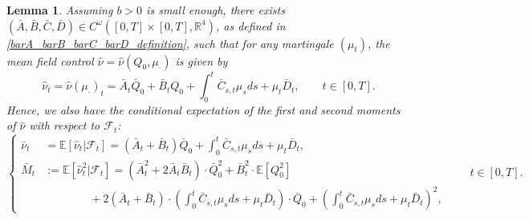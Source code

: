 \documentclass[10pt]{article}
\newtheorem{lemma}[theorem]{Lemma}
\begin{document}
\begin{lemma}\label{lem.hatnu}
Assuming $b > 0$ is small enough, there exists $(\bar{A}, \bar{B}, \bar{C}, \bar{D}) \in C^{\omega}([0,T] \times [0,T], \mathbb{R}^4)$, as defined in \eqref{barA_barB_barC_barD_definition}, such that for any martingale $(\mu_t)$, the mean field control $\hat{\nu} = \hat{\nu}(Q_0,\mu_\cdot)$ is given by
\begin{equation}\label{hatnu_solution}
\hat{\nu}_t = \hat{\nu}(\mu_\cdot)_t = \bar{A}_t \bar{Q}_0 + \bar{B}_t Q_0 + \int_0^t \bar{C}_{s,t} \mu_s ds + \mu_t \bar{D}_t, \qquad t \in [0,T].
\end{equation}
Hence, we also have the conditional expectation of the first and second moments of $\hat{\nu}$ with respect to $\mathcal{F}_t$:
\begin{equation}\label{first_second_conditional_moment_of_hatnu}
\left\{
\begin{aligned}
    \bar \nu_t &= \mathbb E [\hat \nu_t | \mathcal F_t] = ( \bar A_t +\bar B_t ) \bar Q_0 + \int_0^t \bar C_{s,t} \mu_s   ds+ \mu_t \bar D_t, \\
    \bar M_t   &:= \mathbb E [\hat \nu_t^2 | \mathcal F_t] = \left( \bar A_t^2 + 2 \bar A_t \bar B_t \right) \cdot \bar Q_0^2 + \bar B_t^2 \cdot \mathbb E[Q_0^2] \\
     & \qquad\qquad + 2 \left( \bar A_t + \bar B_t \right) \cdot \left( \int_0^t \bar C_{s,t} \mu_s   ds+ \mu_t \bar D_t \right) \cdot \bar Q_0 + \left( \int_0^t \bar C_{s,t} \mu_s   ds+ \mu_t \bar D_t \right)^2,
\end{aligned}
\right.\qquad t \in [0,T].
\end{equation}
\end{lemma}
\end{document}
